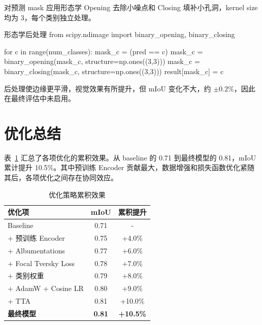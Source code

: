 对预测 mask 应用形态学 Opening 去除小噪点和 Closing 填补小孔洞，kernel size 均为 3，每个类别独立处理。

\begin{codeblock}{形态学后处理}
from scipy.ndimage import binary_opening, binary_closing

for c in range(num_classes):
    mask_c = (pred == c)
    mask_c = binary_opening(mask_c, structure=np.ones((3,3)))
    mask_c = binary_closing(mask_c, structure=np.ones((3,3)))
    result[mask_c] = c
\end{codeblock}

后处理使边缘更平滑，视觉效果有所提升，但 mIoU 变化不大，约 $\pm 0.2\%$，因此在最终评估中未启用。

\section{优化总结}

表~\ref{tab:optimization_summary} 汇总了各项优化的累积效果。从 baseline 的 0.71 到最终模型的 0.81，mIoU 累计提升 10.5\%。其中预训练 Encoder 贡献最大，数据增强和损失函数优化紧随其后，各项优化之间存在协同效应。

\begin{table}[H]
    \centering
    \caption{优化策略累积效果}
    \label{tab:optimization_summary}
    \begin{tabularx}{\textwidth}{Xcc}
        \hline
        \textbf{优化项} & \textbf{mIoU} & \textbf{累积提升} \\
        \hline
        Baseline & 0.71 & - \\
        + 预训练 Encoder & 0.75 & +4.0\% \\
        + Albumentations & 0.77 & +6.0\% \\
        + Focal Tversky Loss & 0.78 & +7.0\% \\
        + 类别权重 & 0.79 & +8.0\% \\
        + AdamW + Cosine LR & 0.80 & +9.0\% \\
        + TTA & 0.81 & +10.0\% \\
        \hline
        \textbf{最终模型} & \textbf{0.81} & \textbf{+10.5\%} \\
        \hline
    \end{tabularx}
\end{table}
